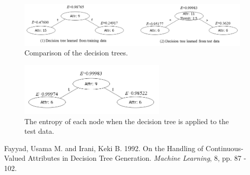 \begin{enumerate}
\begin{figure}[hbtp]
\centering
\includegraphics[width=150mm]{figure2.png}
\caption{Comparison of the decision trees.}
\label{fig:comparison}
\end{figure}

\begin{figure}[hbtp]
\centering
\includegraphics[width=70mm]{figure3.png}
\caption{The entropy of each node when the decision tree is applied to the test data.}
\label{fig:comparison2}
\end{figure}

\end{enumerate}

\begin{thebibliography}{9}
 Fayyad, Usama M. and Irani, Keki B. 1992. On the Handling of Continuous-Valued Attributes in Decision Tree Generation. {\it Machine Learning}, 8, pp. 87 - 102.
\end{thebibliography}




